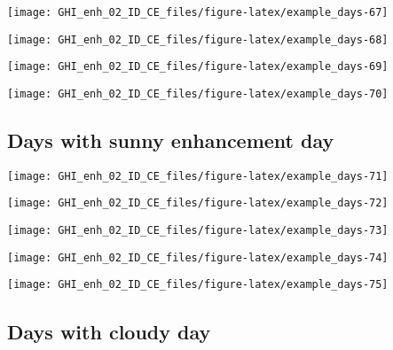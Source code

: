 \documentclass[
  10pt,
  a4paper,oneside]{article}
\begin{document}
\begin{center}\texttt{[image: GHI\_enh\_02\_ID\_CE\_files/figure-latex/example\_days-67]} \end{center}

\begin{center}\texttt{[image: GHI\_enh\_02\_ID\_CE\_files/figure-latex/example\_days-68]} \end{center}

\begin{center}\texttt{[image: GHI\_enh\_02\_ID\_CE\_files/figure-latex/example\_days-69]} \end{center}

\begin{center}\texttt{[image: GHI\_enh\_02\_ID\_CE\_files/figure-latex/example\_days-70]} \end{center}

\FloatBarrier

\hypertarget{days-with-sunny-enhancement-day}{%
\subsection{Days with sunny enhancement day}\label{days-with-sunny-enhancement-day}}

\begin{center}\texttt{[image: GHI\_enh\_02\_ID\_CE\_files/figure-latex/example\_days-71]} \end{center}

\begin{center}\texttt{[image: GHI\_enh\_02\_ID\_CE\_files/figure-latex/example\_days-72]} \end{center}

\begin{center}\texttt{[image: GHI\_enh\_02\_ID\_CE\_files/figure-latex/example\_days-73]} \end{center}

\begin{center}\texttt{[image: GHI\_enh\_02\_ID\_CE\_files/figure-latex/example\_days-74]} \end{center}

\begin{center}\texttt{[image: GHI\_enh\_02\_ID\_CE\_files/figure-latex/example\_days-75]} \end{center}

\FloatBarrier

\hypertarget{days-with-cloudy-day}{%
\subsection{Days with cloudy day}\label{days-with-cloudy-day}}
\end{document}
